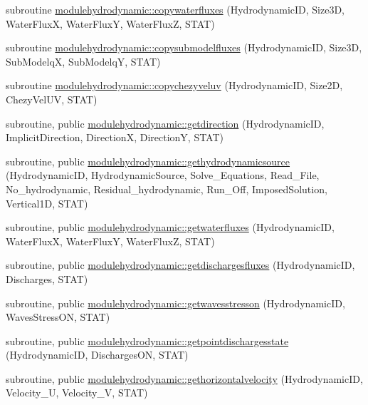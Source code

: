 \begin{DoxyCompactItemize}
\item 
subroutine \mbox{\hyperlink{namespacemodulehydrodynamic_a389c77d3103d5944ec90680d613d2e56}{modulehydrodynamic\+::copywaterfluxes}} (Hydrodynamic\+ID, Size3D, Water\+FluxX, Water\+FluxY, Water\+FluxZ, S\+T\+AT)
\item 
subroutine \mbox{\hyperlink{namespacemodulehydrodynamic_a69bb56671a822946694acb66f9417d61}{modulehydrodynamic\+::copysubmodelfluxes}} (Hydrodynamic\+ID, Size3D, Sub\+ModelqX, Sub\+ModelqY, S\+T\+AT)
\item 
subroutine \mbox{\hyperlink{namespacemodulehydrodynamic_a7f81263a032159db07514b5cfba12a65}{modulehydrodynamic\+::copychezyveluv}} (Hydrodynamic\+ID, Size2D, Chezy\+Vel\+UV, S\+T\+AT)
\item 
subroutine, public \mbox{\hyperlink{namespacemodulehydrodynamic_aaf6054c97ad6e684bd893e075b4d0641}{modulehydrodynamic\+::getdirection}} (Hydrodynamic\+ID, Implicit\+Direction, DirectionX, DirectionY, S\+T\+AT)
\item 
subroutine, public \mbox{\hyperlink{namespacemodulehydrodynamic_ab585744f4ba5d5552dabea7edb88d98b}{modulehydrodynamic\+::gethydrodynamicsource}} (Hydrodynamic\+ID, Hydrodynamic\+Source, Solve\+\_\+\+Equations, Read\+\_\+\+File, No\+\_\+hydrodynamic, Residual\+\_\+hydrodynamic, Run\+\_\+\+Off, Imposed\+Solution, Vertical1D, S\+T\+AT)
\item 
subroutine, public \mbox{\hyperlink{namespacemodulehydrodynamic_a29f89183d9394468a6db08ec640599f1}{modulehydrodynamic\+::getwaterfluxes}} (Hydrodynamic\+ID, Water\+FluxX, Water\+FluxY, Water\+FluxZ, S\+T\+AT)
\item 
subroutine, public \mbox{\hyperlink{namespacemodulehydrodynamic_ae3e2525663a2551838685e1e108e3145}{modulehydrodynamic\+::getdischargesfluxes}} (Hydrodynamic\+ID, Discharges, S\+T\+AT)
\item 
subroutine, public \mbox{\hyperlink{namespacemodulehydrodynamic_a40c227e3eb106f2eae640e8533ab5e3b}{modulehydrodynamic\+::getwavesstresson}} (Hydrodynamic\+ID, Waves\+Stress\+ON, S\+T\+AT)
\item 
subroutine, public \mbox{\hyperlink{namespacemodulehydrodynamic_a6ebc590498ef2108834cad47a70d1f3a}{modulehydrodynamic\+::getpointdischargesstate}} (Hydrodynamic\+ID, Discharges\+ON, S\+T\+AT)
\item 
subroutine, public \mbox{\hyperlink{namespacemodulehydrodynamic_aba7eae61c437ef648710efabc4d39e36}{modulehydrodynamic\+::gethorizontalvelocity}} (Hydrodynamic\+ID, Velocity\+\_\+U, Velocity\+\_\+V, S\+T\+AT)
\item 

\end{DoxyCompactItemize}
